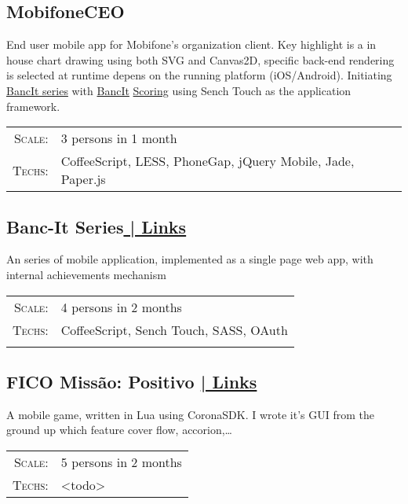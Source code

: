 \documentclass[a4paper,10pt]{article}
\begin{document}
\subsection*{MobifoneCEO}

End user mobile app for Mobifone's organization client. Key highlight is a in house chart drawing using both SVG and Canvas2D, specific back-end rendering is selected at runtime depens on the running platform (iOS/Android).
 Initiating \href{http://bankerslab.com/banc-it/}{BancIt series} with \href{https://itunes.apple.com/us/app/bancit-scoring/id599922020?mt=8}{BancIt} \href{https://play.google.com/store/apps/details?id=com.bankerslab.scoring&hl=en}{Scoring} using Sench Touch as the application framework.

\begin{tabular}{rl}
    \textsc{Scale:} & 3 persons in 1 month\\
    \textsc{Techs:} & CoffeeScript, LESS, PhoneGap, jQuery Mobile, Jade, Paper.js\\
\end{tabular}

\subsection*{Banc-It Series\hfill \hyperlink{bancit-links}{ | \footnotesize Links}}

An series of mobile application, implemented as a single page web app, with internal achievements mechanism

\begin{tabular}{rl}
    \textsc{Scale:} & 4 persons in 2 months\\
    \textsc{Techs:} & CoffeeScript, Sench Touch, SASS, OAuth\\
    \\
    
\end{tabular}

\subsection*{FICO Missão: Positivo \hfill \hyperlink{missao-links} { | \footnotesize Links}}

A mobile game, written in Lua using CoronaSDK. I wrote it's GUI from the ground up which feature cover flow, accorion,\ldots

\begin{tabular}{rl}
    \textsc{Scale:} & 5 persons in 2 months\\
    \textsc{Techs:} & <todo>\\
\end{tabular}
\end{document}
